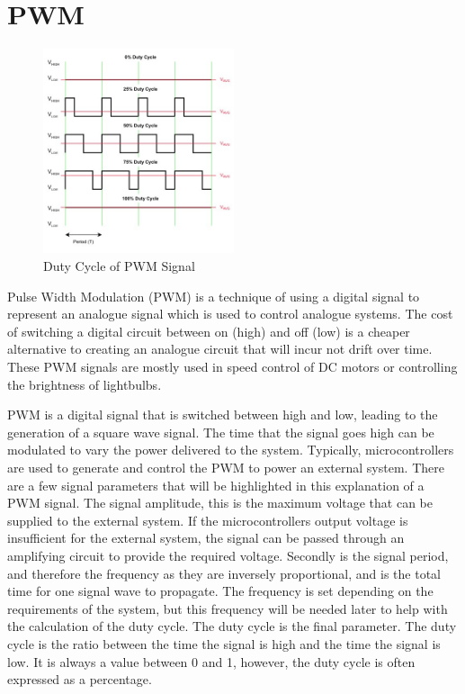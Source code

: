\section{PWM}
\begin{figure}
	\begin{center}
		\includegraphics[width = 0.5\textwidth]{figures/PWM.jpg}
		\caption{Duty Cycle of PWM Signal}
		\label{fig:2:PWM}
	\end{center}
\end{figure}
Pulse Width Modulation (PWM) is a technique of using a digital signal to represent an analogue signal which is used to control analogue systems. The cost of switching a digital circuit between on (high) and off (low) is a cheaper alternative to creating an analogue circuit that will incur not drift over time. These PWM signals are mostly used in speed control of DC motors or controlling the brightness of lightbulbs. \cite{Christ2014}\par
\vspace{0.6cm}
PWM is a digital signal that is switched between high and low, leading to the generation of a square wave signal. The time that the signal goes high can be modulated to vary the power delivered to the system. Typically, microcontrollers are used to generate and control the PWM to power an external system. There are a few signal parameters that will be highlighted in this explanation of a PWM signal. The signal amplitude, this is the maximum voltage that can be supplied to the external system. If the microcontrollers output voltage is insufficient for the external system, the signal can be passed through an amplifying circuit to provide the required voltage. Secondly is the signal period, and therefore the frequency as they are inversely proportional, and is the total time for one signal wave to propagate. The frequency is set depending on the requirements of the system, but this frequency will be needed later to help with the calculation of the duty cycle. The duty cycle is the final parameter. The duty cycle is the ratio between the time the signal is high and the time the signal is low. It is always a value between 0 and 1, however, the duty cycle is often expressed as a percentage.\par
